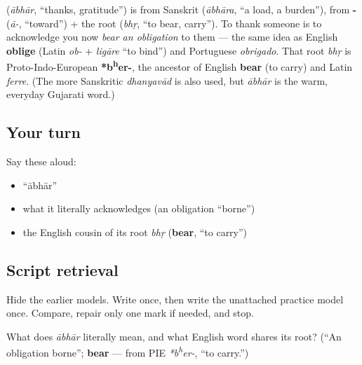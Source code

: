 \begin{cousinweb}
\textbf{} (\emph{ābhār}, \textquotedblleft{}thanks, gratitude\textquotedblright{}) is from Sanskrit \textbf{} (\emph{ābhāra}, \textquotedblleft{}a load, a burden\textquotedblright{}), from \textbf{-} (\emph{ā-}, \textquotedblleft{}toward\textquotedblright{}) + the root \textbf{} (\emph{bhṛ}, \textquotedblleft{}to bear, carry\textquotedblright{}). To thank someone is to acknowledge you now \emph{bear an obligation} to them — the same idea as English \textbf{oblige} (Latin \emph{ob-} + \emph{ligāre} \textquotedblleft{}to bind\textquotedblright{}) and Portuguese \emph{obrigado}. That root \emph{bhṛ} is Proto-Indo-European \textbf{*b\textsuperscript{h}er-}, the ancestor of English \textbf{bear} (to carry) and Latin \emph{ferre}. (The more Sanskritic \textbf{} \emph{dhanyavād} is also used, but \emph{ābhār} is the warm, everyday Gujarati word.)
\end{cousinweb}

\subsection*{Your turn}
Say these aloud:

\begin{itemize}
\raggedright
  \item \textquotedblleft{}ābhār\textquotedblright{}
  \item what it literally acknowledges (an obligation \textquotedblleft{}borne\textquotedblright{})
  \item the English cousin of its root \emph{bhṛ} (\textbf{bear}, \textquotedblleft{}to carry\textquotedblright{})
\end{itemize}

\subsection*{Script retrieval}
Hide the earlier models. Write \textbf{} once, then write the unattached practice model \textbf{} once. Compare, repair only one mark if needed, and stop.

\begin{tcolorbox}[breakable,colback=teal!4,colframe=teal!35!black,title={Before you move on}]
What does \emph{ābhār} literally mean, and what English word shares its root? (\textquotedblleft{}An obligation borne\textquotedblright{}; \textbf{bear} — from PIE \emph{*b\textsuperscript{h}er-}, \textquotedblleft{}to carry.\textquotedblright{})
\end{tcolorbox}
